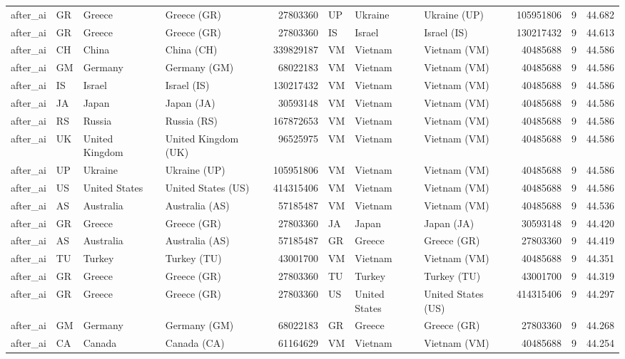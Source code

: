 \begin{tabular}{llllrlllrrr}
after\_ai & GR & Greece & Greece (GR) & 27803360 & UP & Ukraine & Ukraine (UP) & 105951806 & 9 & 44.682 \\
after\_ai & GR & Greece & Greece (GR) & 27803360 & IS & Israel & Israel (IS) & 130217432 & 9 & 44.613 \\
after\_ai & CH & China & China (CH) & 339829187 & VM & Vietnam & Vietnam (VM) & 40485688 & 9 & 44.586 \\
after\_ai & GM & Germany & Germany (GM) & 68022183 & VM & Vietnam & Vietnam (VM) & 40485688 & 9 & 44.586 \\
after\_ai & IS & Israel & Israel (IS) & 130217432 & VM & Vietnam & Vietnam (VM) & 40485688 & 9 & 44.586 \\
after\_ai & JA & Japan & Japan (JA) & 30593148 & VM & Vietnam & Vietnam (VM) & 40485688 & 9 & 44.586 \\
after\_ai & RS & Russia & Russia (RS) & 167872653 & VM & Vietnam & Vietnam (VM) & 40485688 & 9 & 44.586 \\
after\_ai & UK & United Kingdom & United Kingdom (UK) & 96525975 & VM & Vietnam & Vietnam (VM) & 40485688 & 9 & 44.586 \\
after\_ai & UP & Ukraine & Ukraine (UP) & 105951806 & VM & Vietnam & Vietnam (VM) & 40485688 & 9 & 44.586 \\
after\_ai & US & United States & United States (US) & 414315406 & VM & Vietnam & Vietnam (VM) & 40485688 & 9 & 44.586 \\
after\_ai & AS & Australia & Australia (AS) & 57185487 & VM & Vietnam & Vietnam (VM) & 40485688 & 9 & 44.536 \\
after\_ai & GR & Greece & Greece (GR) & 27803360 & JA & Japan & Japan (JA) & 30593148 & 9 & 44.420 \\
after\_ai & AS & Australia & Australia (AS) & 57185487 & GR & Greece & Greece (GR) & 27803360 & 9 & 44.419 \\
after\_ai & TU & Turkey & Turkey (TU) & 43001700 & VM & Vietnam & Vietnam (VM) & 40485688 & 9 & 44.351 \\
after\_ai & GR & Greece & Greece (GR) & 27803360 & TU & Turkey & Turkey (TU) & 43001700 & 9 & 44.319 \\
after\_ai & GR & Greece & Greece (GR) & 27803360 & US & United States & United States (US) & 414315406 & 9 & 44.297 \\
after\_ai & GM & Germany & Germany (GM) & 68022183 & GR & Greece & Greece (GR) & 27803360 & 9 & 44.268 \\
after\_ai & CA & Canada & Canada (CA) & 61164629 & VM & Vietnam & Vietnam (VM) & 40485688 & 9 & 44.254 \\

\end{tabular}
